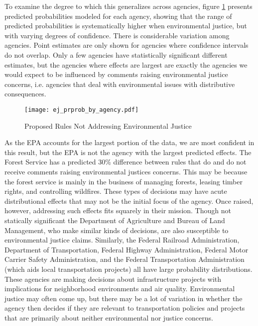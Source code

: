 To examine the degree to which this generalizes across agencies, figure \ref{ejlogitagencies} presents predicted probabilities modeled for each agency, showing that the range of predicted probabilities is systematically higher when environmental justice, but with varying degrees of confidence. There is considerable variation among agencies. Point estimates are only shown for agencies where confidence intervals do not overlap. Only a few agencies have statistically significant different estimates, but the agencies where effects are largest are exactly the agencies we would expect to be influenced by comments raising environmental justice concerns, i.e. agencies that deal with environmental issues with distributive consequences. 


\begin{figure}[h!]
\caption{Proposed Rules Not Addressing Environmental Justice}
\texttt{[image: ej\_prprob\_by\_agency.pdf]}
\label{ejlogitagencies}

\end{figure}

As the EPA accounts for the largest portion of the data, we are most confident in this result, but the EPA is not the agency with the largest predicted effects. The Forest Service has a predicted 30\% difference between rules that do and do not receive comments raising environmental justices concerns. This may be because the forest service is mainly in the business of managing forests, leasing timber rights, and controlling wildfires. These types of decisions may have acute distributional effects that may not be the initial focus of the agency. Once raised, however, addressing such effects fits squarely in their mission. Though not statically significant the Department of Agriculture and Bureau of Land Management, who make similar kinds of decisions, are also susceptible to environmental justice claims. Similarly, the Federal Railroad Administration, Department of Transportation, Federal Highway Administration, Federal Motor Carrier Safety Administration, and the Federal Transportation Administration (which aids local transportation projects) all have large probability distributions. These agencies are making decisions about infrastructure projects with implications for neighborhood environments and air quality. Environmental justice may often come up, but there may be a lot of variation in whether the agency then decides if they are relevant to transportation policies and projects that are primarily about neither environmental nor justice concerns. 

